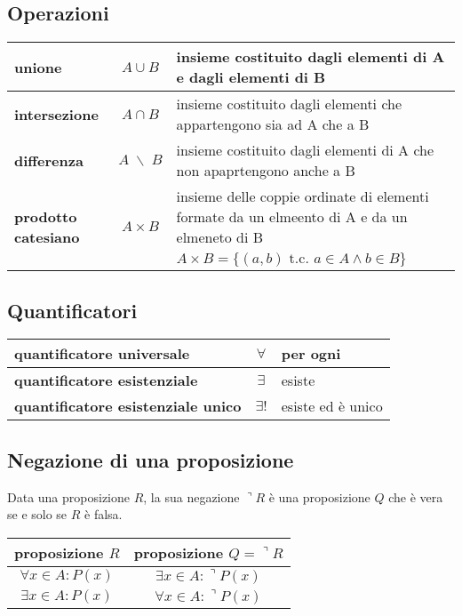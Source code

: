 \documentclass[a4paper]{article}
\begin{document}
\subsection{Operazioni}
\begin{center}
	\begin{tabularx}{\textwidth}{l c X}
		\textbf{unione} & \(A \cup B\) & insieme costituito dagli elementi di A e dagli elementi di B \\
		\midrule
		\textbf{intersezione} & \(A \cap B\) & insieme costituito dagli elementi che appartengono sia ad A che a B \\
		\midrule
		\textbf{differenza} & \(A \; \backslash \; B\) & insieme costituito dagli elementi di A che non apaprtengono anche a B \\
		\midrule
		\multirow{2}{*}{\textbf{prodotto catesiano}} & 	\multirow{2}{*}{\(A \times B\)} & insieme delle coppie ordinate di elementi formate da un elmeento di A e da un elmeneto di B \\
		& & \(A \times B = \{ (a, b) \text{ t.c. } a \in A \land b \in B \}\)
	\end{tabularx}
\end{center}


\subsection{Quantificatori}
\begin{center}
	\begin{tabular}{l c l}
		\textbf{quantificatore universale} & \(\forall\) & per ogni \\
		\midrule
		\textbf{quantificatore esistenziale} & \(\exists\) & esiste \\
		\midrule
		\textbf{quantificatore esistenziale unico} & \(\exists!\) & esiste ed è unico
	\end{tabular}
\end{center}


\subsection{Negazione di una proposizione}
Data una proposizione \(R\), la sua negazione \(\urcorner R\) è una proposizione \(Q\) che è vera se e solo se \(R\) è falsa.

\begin{center}
	\begin{tabular}{c c}
		proposizione \(R\) & proposizione \(Q = \urcorner R\) \\
		\toprule
		\(\forall x \in A : P(x)\) & \(\exists x \in A : \urcorner P(x)\) \\
		\midrule
		\(\exists x \in A : P(x)\) & \(\forall x \in A : \urcorner P(x)\) \\
	\end{tabular}
\end{center}
\end{document}
